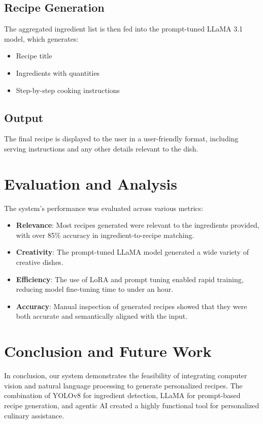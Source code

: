 \documentclass[letterpaper,11pt]{report}
\begin{document}
\subsection{Recipe Generation}
The aggregated ingredient list is then fed into the prompt-tuned LLaMA 3.1 model, which generates:
\begin{itemize}
    \item Recipe title
    \item Ingredients with quantities
    \item Step-by-step cooking instructions
\end{itemize}

\subsection{Output}
The final recipe is displayed to the user in a user-friendly format, including serving instructions and any other details relevant to the dish.

\section{Evaluation and Analysis}
The system’s performance was evaluated across various metrics:

\begin{itemize}
    \item \textbf{Relevance}: Most recipes generated were relevant to the ingredients provided, with over 85\% accuracy in ingredient-to-recipe matching.
    \item \textbf{Creativity}: The prompt-tuned LLaMA model generated a wide variety of creative dishes.
    \item \textbf{Efficiency}: The use of LoRA and prompt tuning enabled rapid training, reducing model fine-tuning time to under an hour.
    \item \textbf{Accuracy}: Manual inspection of generated recipes showed that they were both accurate and semantically aligned with the input.
\end{itemize}

\section{Conclusion and Future Work}
In conclusion, our system demonstrates the feasibility of integrating computer vision and natural language processing to generate personalized recipes. The combination of YOLOv8 for ingredient detection, LLaMA for prompt-based recipe generation, and agentic AI created a highly functional tool for personalized culinary assistance.
\end{document}
